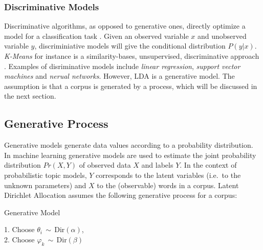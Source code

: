 \documentclass[a4paper,ngerman, english]{atseminar}
\begin{document}
\subsubsection{Discriminative Models}
Discriminative algorithms, as opposed to generative ones, directly optimize a model for a classification task \cite{jebara2001discriminative}.
Given an observed variable $x$ and unobserved variable $y$, discriminiative models will give the conditional distribution $P(y | x)$.
\textit{K-Means} for instance is a similarity-bases, unsupervised, discriminative approach \cite{zhong2005generative}.
Examples of disriminative models include \textit{linear regression}, \textit{support vector machines} and \textit{nerual networks}.
However, LDA is a generative model. The assumption is that a corpus is generated by a process, which will be discussed in the next section.

\subsection{Generative Process} \label{sec:generative}
Generative models generate data values according to a probability distribution. In machine learning
generative models are used to estimate the joint probability distribution $Pr(X,Y)$ of observed data $X$
and labels $Y$. In the context of probabilistic topic models, $Y$ corresponds to the latent variables (i.e.~to the unknown parameters) and $X$ to the (observable) words in a corpus.
Latent Dirichlet Allocation assumes the following generative process for
a corpus: \\

\begin{algorithm}[H]
\caption{Generative Model}
1. Choose $ \theta_i \, \sim \, \mathrm{Dir}(\alpha) $,  \\
2. Choose $ \varphi_k \, \sim \, \mathrm{Dir}(\beta) $ \\
\end{algorithm}
\vspace{1.5cm}
\end{document}
